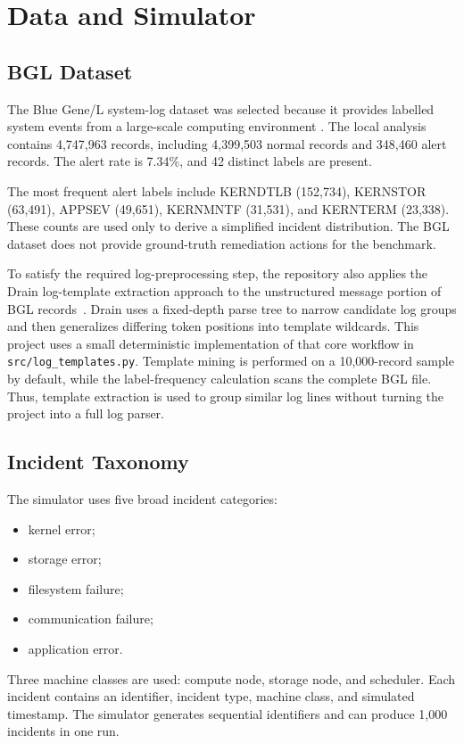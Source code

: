 \documentclass[conference]{IEEEtran}
\begin{document}
\section{Data and Simulator}

\subsection{BGL Dataset}
The Blue Gene/L system-log dataset was selected because it provides labelled
system events from a large-scale computing environment \cite{oliner,loghub}. The
local analysis contains 4,747,963 records, including 4,399,503 normal records
and 348,460 alert records. The alert rate is 7.34\%, and 42 distinct labels
are present.

The most frequent alert labels include KERNDTLB (152,734), KERNSTOR (63,491),
APPSEV (49,651), KERNMNTF (31,531), and KERNTERM (23,338). These counts are
used only to derive a simplified incident distribution. The BGL dataset does
not provide ground-truth remediation actions for the benchmark.

To satisfy the required log-preprocessing step, the repository also applies the
Drain log-template extraction approach to the unstructured message portion of
BGL records~\cite{drain}. Drain uses a fixed-depth parse tree to narrow candidate
log groups and then generalizes differing token positions into template
wildcards. This project uses a small deterministic implementation of that core
workflow in \texttt{src/log\_templates.py}. Template mining is performed on a
10,000-record sample by default, while the label-frequency calculation scans
the complete BGL file. Thus, template extraction is used to group similar log
lines without turning the project into a full log parser.

\subsection{Incident Taxonomy}
The simulator uses five broad incident categories:

\begin{itemize}
\item kernel error;
\item storage error;
\item filesystem failure;
\item communication failure;
\item application error.
\end{itemize}

Three machine classes are used: compute node, storage node, and scheduler.
Each incident contains an identifier, incident type, machine class, and
simulated timestamp. The simulator generates sequential identifiers and can
produce 1,000 incidents in one run.
\end{document}

